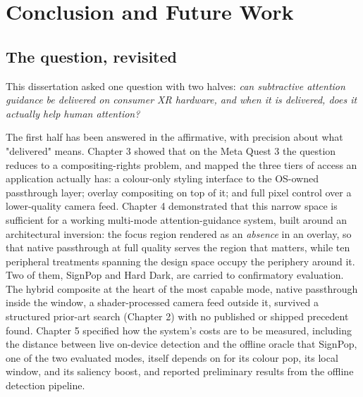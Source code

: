 \chapter{Conclusion and Future Work}

\section{The question, revisited}

This dissertation asked one question with two halves: \textit{can subtractive attention guidance be
delivered on consumer XR hardware, and when it is delivered, does it actually help human attention?}

The first half has been answered in the affirmative, with precision about what "delivered" means.
Chapter 3 showed that on the Meta Quest 3 the question reduces to a compositing-rights problem, and
mapped the three tiers of access an application actually has: a colour-only styling interface to the
OS-owned passthrough layer; overlay compositing on top of it; and full pixel control over a
lower-quality camera feed. Chapter 4 demonstrated that this narrow space is sufficient for a working
multi-mode attention-guidance system, built around an architectural inversion: the focus region
rendered as an \textit{absence} in an overlay, so that native passthrough at full quality serves the region
that matters, while ten peripheral treatments spanning the design space occupy the periphery around
it. Two of them, SignPop and Hard Dark, are carried to confirmatory evaluation. The hybrid composite at
the heart of the most capable mode, native passthrough inside the window, a shader-processed camera
feed outside it, survived a structured prior-art search (Chapter 2) with no published or shipped
precedent found. Chapter 5 specified how the system's costs are to be measured, including the
distance between live on-device detection and the offline oracle that SignPop, one of the two
evaluated modes, itself depends on for its colour pop, its local window, and its saliency boost, and
reported preliminary results from the offline detection pipeline.

